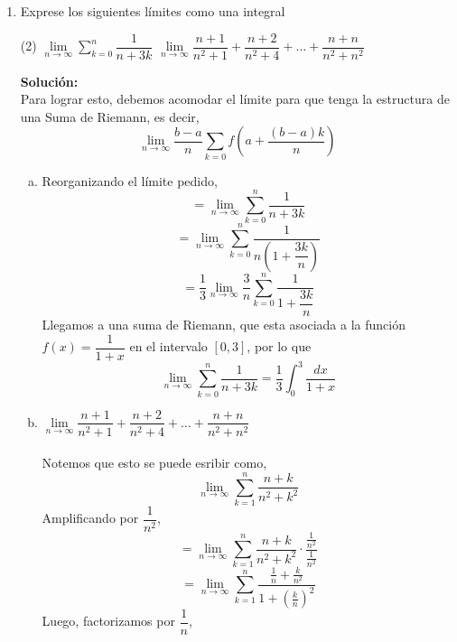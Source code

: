 \documentclass[12pt]{article}
\newenvironment{solucion}
{\begin{mdframed}[backgroundcolor=black!10]
		{\bf Solución:}\\
	}
	{
	\end{mdframed}
}
\newenvironment{preguntas}
{\begin{enumerate}\itemsep12pt
	}
	{
	\end{enumerate}
}
\newcommand{\ra}{\rightarrow}
\begin{document}
\begin{preguntas}
\begin{solucion}
		Luego, procedemos a resolver el límite
		$$= \lim\limits_{n\ra \infty} \dfrac{3}{n} \sum\limits_{i=1}^n \left[4-2 \left(2+\dfrac{3i}{n}\right)\right]$$
		$$= \lim\limits_{n\ra \infty} \dfrac{3}{n} \sum\limits_{i=1}^n \left[4-4-\dfrac{6i}{n}\right]$$
		$$= \lim\limits_{n\ra \infty} \dfrac{3}{n} \sum\limits_{i=1}^n \left[-\dfrac{6i}{n}\right]$$
		$$= -18\lim\limits_{n\ra \infty} \dfrac{1}{n^2} \sum\limits_{i=1}^n i$$
		$$= -18\lim\limits_{n\ra \infty} \dfrac{1}{n^2} \dfrac{n(n+1)}{2}$$
		$$= -9\lim\limits_{n\ra \infty} \dfrac{n+1}{n}$$
		$$= -9$$
\end{solucion}
\item Exprese los siguientes límites como una integral
	
\begin{tasks}(2)
\task $\lim\limits_{n\ra \infty} \sum\limits_{k=0}^n \dfrac{1}{n+3k}$
\task $\lim\limits_{n \ra \infty} \dfrac{n+1}{n^2+1} + \dfrac{n+2}{n^2+4} + \dots  + \dfrac{n+n}{n^2+n^2}$
\end{tasks}
\begin{solucion}
Para lograr esto, debemos acomodar el límite para que tenga la estructura de una Suma de Riemann, es decir,
		$$\lim\limits_{n \ra \infty} \dfrac{b-a}{n}\sum\limits_{k=0} f\left(a+\dfrac{(b-a)k}{n}\right)$$
\begin{enumerate}[a)]
\item Reorganizando el límite pedido,
		$$ = \lim\limits_{n\ra \infty} \sum\limits_{k=0}^n \dfrac{1}{n+3k}$$
		$$ = \lim\limits_{n\ra \infty} \sum\limits_{k=0}^n \dfrac{1}{n\left(1+\dfrac{3k}{n}\right)}$$
		$$ = \dfrac{1}{3} \lim\limits_{n\ra \infty} \dfrac{3}{n} \sum\limits_{k=0}^n \dfrac{1}{1+\dfrac{3k}{n}}$$
		Llegamos a una suma de Riemann, que esta asociada a la función $f(x) = \dfrac{1}{1+x}$ en el intervalo $[0, 3]$, por lo que
		$$\lim\limits_{n\ra \infty} \sum\limits_{k=0}^n \dfrac{1}{n+3k} = \dfrac{1}{3} \displaystyle\int_0^3 \dfrac{dx}{1+x}$$
\item $\lim\limits_{n \ra \infty} \dfrac{n+1}{n^2+1} + \dfrac{n+2}{n^2+4} + \dots  + \dfrac{n+n}{n^2+n^2}$\\
\\
Notemos que esto se puede esribir como,
$$\lim\limits_{n \ra \infty} \sum\limits_{k=1}^n \dfrac{n+k}{n^2+k^2}$$
Amplificando por $\dfrac{1}{n^2}$,
$$= \lim\limits_{n \ra \infty} \sum\limits_{k=1}^n \dfrac{n+k}{n^2+k^2}\cdot \dfrac{\frac{1}{n^2}}{\frac{1}{n^2}}$$
$$= \lim\limits_{n \ra \infty} \sum\limits_{k=1}^n \dfrac{\frac{1}{n}+\frac{k}{n^2}}{1+\left(\frac{k}{n}\right)^2}$$
Luego, factorizamos por $\dfrac{1}{n}$,

\end{enumerate}
\end{solucion}
\end{preguntas}
\end{document}
